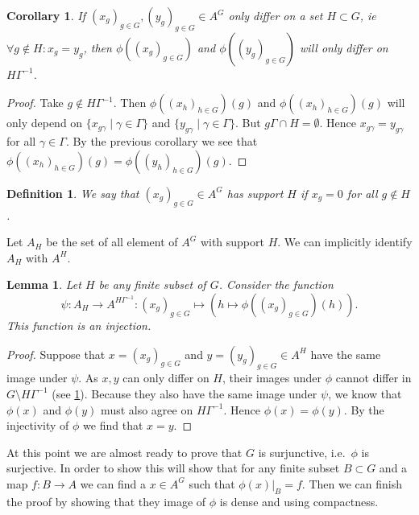 \documentclass[titlepage, a4paper]{article}
\newtheorem{definition}[theorem]{Definition}
\newtheorem{lemma}[theorem]{Lemma}
\newtheorem{corollary}[theorem]{Corollary}
\theoremstyle{remark}
\begin{document}
\begin{corollary}\label{cor:differ_in_image}
	If $(x_g)_{g \in G}, (y_g)_{g\in G} \in A^{G}$ only differ on a set $H \subset G$, ie $\forall g \not\in H:x_g = y_g$,
	then  $\phi((x_g)_{g \in G})$ and $\phi((y_g)_{g \in G})$ will only differ on $H\Gamma^{-1}$.
\end{corollary}
\begin{proof}
	Take $g \not\in H\Gamma^{-1}$. Then $\phi((x_h)_{h \in G})(g)$ and $\phi((x_h)_{h\in G})(g)$ will only depend on  $\{x_{g\gamma}\mid \gamma \in \Gamma\}$ and $\{y_{g\gamma}\mid \gamma \in \Gamma\} $. But  $g\Gamma \cap H = \emptyset$. Hence $x_{g\gamma} = y_{g\gamma}$ for all $\gamma \in \Gamma$. By the previous corollary we see that $\phi((x_h)_{h \in G})(g) = \phi((y_h)_{h \in G})(g)$.
\end{proof}

\begin{definition}
	We say that $(x_g)_{g \in G} \in A^{G}$ has support $H$ if $x_g = 0$ for all $g \not\in H$.
\end{definition}
Let $A_H$ be the set of all element of  $A^{G}$ with support $H$. We can implicitly identify $A_H$ with $A^{H}$.

\begin{lemma}\label{lem:injective_restriction}
	Let $H$ be any finite subset of $G$. Consider the function  \[
		\psi:A_H \to A ^{H\Gamma^{-1}}: (x_g)_{g \in G} \mapsto \left(h \mapsto \phi((x_g)_{g \in G})(h)\right)
	.\]  
	This function is an injection. 
\end{lemma}
\begin{proof}
	Suppose that $x= (x_g)_{g \in G}$ and $ y = (y_g)_{g \in G} \in A^{H}$ have the same image under $\psi$. As $x, y$ can only differ on $ H$, their images under $\phi$ cannot differ in $G\setminus H\Gamma^{-1}$ (see \cref{cor:differ_in_image}). Because they also have the same image under $\psi$, we know that $\phi(x)$ and $\phi(y)$ must also agree on $H\Gamma^{-1}$. Hence $\phi(x) = \phi(y)$. By the injectivity of $\phi$ we find that $x = y$.
\end{proof}

At this point we are almost ready to prove that $G$ is surjunctive, i.e.\ $\phi$ is surjective. 
In order to show this will show that for any finite subset $B\subset G$ and a map $f:B \to A$ we can find a $x \in A^{G}$ such that $\phi\left(x \right) |_B  = f$. Then we can finish the proof by showing that they image of $\phi$ is dense and using compactness.
\end{document}
